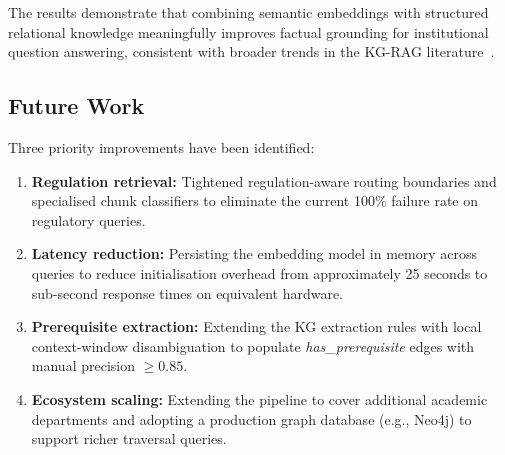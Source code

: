\documentclass{ieeeaccess}
\begin{document}
The results demonstrate that combining semantic embeddings with structured relational knowledge meaningfully improves factual grounding for institutional question answering, consistent with broader trends in the KG-RAG literature~\cite{b1,b2}.

\subsection{Future Work}
Three priority improvements have been identified:
\begin{enumerate}
    \item \textbf{Regulation retrieval:} Tightened regulation-aware routing boundaries and specialised chunk classifiers to eliminate the current 100\% failure rate on regulatory queries.
    \item \textbf{Latency reduction:} Persisting the embedding model in memory across queries to reduce initialisation overhead from approximately 25 seconds to sub-second response times on equivalent hardware.
    \item \textbf{Prerequisite extraction:} Extending the KG extraction rules with local context-window disambiguation to populate \textit{has\_prerequisite} edges with manual precision $\geq 0.85$.
    \item \textbf{Ecosystem scaling:} Extending the pipeline to cover additional academic departments and adopting a production graph database (e.g., Neo4j) to support richer traversal queries.
\end{enumerate}
\end{document}
